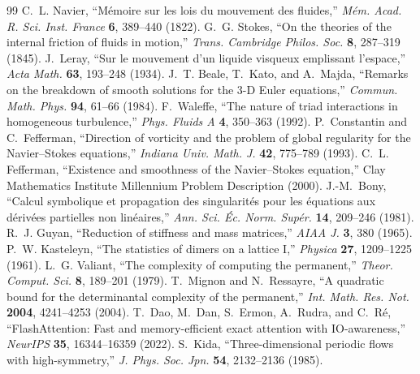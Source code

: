 \documentclass[10pt]{article}
\renewcommand{\_}{\OrigUnderscore\hspace{0pt}}
\numberwithin{equation}{section}
\begin{document}
\begin{thebibliography}{99}
 C.~L. Navier, ``M\'emoire sur les lois du mouvement des fluides,'' \emph{M\'em. Acad. R. Sci. Inst. France} \textbf{6}, 389--440 (1822).
 G.~G. Stokes, ``On the theories of the internal friction of fluids in motion,'' \emph{Trans. Cambridge Philos. Soc.} \textbf{8}, 287--319 (1845).
 J.~Leray, ``Sur le mouvement d'un liquide visqueux emplissant l'espace,'' \emph{Acta Math.} \textbf{63}, 193--248 (1934).
 J.~T. Beale, T.~Kato, and A.~Majda, ``Remarks on the breakdown of smooth solutions for the $3$-D Euler equations,'' \emph{Commun. Math. Phys.} \textbf{94}, 61--66 (1984).
 F.~Waleffe, ``The nature of triad interactions in homogeneous turbulence,'' \emph{Phys. Fluids A} \textbf{4}, 350--363 (1992).
 P.~Constantin and C.~Fefferman, ``Direction of vorticity and the problem of global regularity for the Navier--Stokes equations,'' \emph{Indiana Univ. Math. J.} \textbf{42}, 775--789 (1993).
 C.~L. Fefferman, ``Existence and smoothness of the Navier--Stokes equation,'' Clay Mathematics Institute Millennium Problem Description (2000).
 J.-M.~Bony, ``Calcul symbolique et propagation des singularit\'es pour les \'equations aux d\'eriv\'ees partielles non lin\'eaires,'' \emph{Ann. Sci. \'Ec. Norm. Sup\'er.} \textbf{14}, 209--246 (1981).
 R.~J. Guyan, ``Reduction of stiffness and mass matrices,'' \emph{AIAA J.} \textbf{3}, 380 (1965).
 P.~W. Kasteleyn, ``The statistics of dimers on a lattice I,'' \emph{Physica} \textbf{27}, 1209--1225 (1961).
 L.~G. Valiant, ``The complexity of computing the permanent,'' \emph{Theor. Comput. Sci.} \textbf{8}, 189--201 (1979).
 T.~Mignon and N.~Ressayre, ``A quadratic bound for the determinantal complexity of the permanent,'' \emph{Int. Math. Res. Not.} \textbf{2004}, 4241--4253 (2004).
 T.~Dao, M.~Dan, S.~Ermon, A.~Rudra, and C.~R\'e, ``FlashAttention: Fast and memory-efficient exact attention with IO-awareness,'' \emph{NeurIPS} \textbf{35}, 16344--16359 (2022).
 S.~Kida, ``Three-dimensional periodic flows with high-symmetry,'' \emph{J. Phys. Soc. Jpn.} \textbf{54}, 2132--2136 (1985).
\end{thebibliography}
\end{document}
